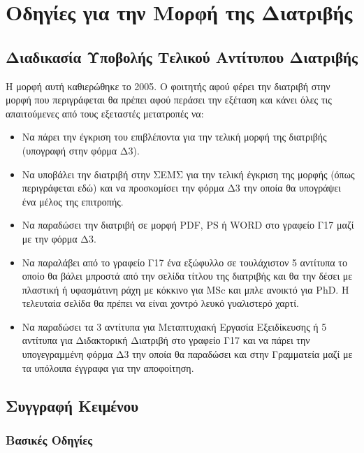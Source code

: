 \chapter{Οδηγίες για την Μορφή της Διατριβής}
\label{ch:Instructions}
\minitoc


\section{Διαδικασία Υποβολής Τελικού Αντίτυπου Διατριβής}
\label{sec:Submission}

{\color{red}
Η μορφή αυτή καθιερώθηκε το 2005. Ο φοιτητής αφού φέρει την
διατριβή στην μορφή που περιγράφεται θα πρέπει αφού περάσει την
εξέταση και κάνει όλες τις απαιτούμενες από τους εξεταστές
μετατροπές να:

\begin{itemize}
\item Να πάρει την έγκριση του επιβλέποντα για την τελική μορφή της διατριβής (υπογραφή στην φόρμα Δ3).
\item Να υποβάλει την διατριβή στην ΣΕΜΣ για την τελική έγκριση της μορφής (όπως περιγράφεται εδώ) και να προσκομίσει την φόρμα Δ3 την οποία θα υπογράψει ένα μέλος της επιτροπής.
\item Να παραδώσει την διατριβή σε μορφή PDF, PS ή WORD στο γραφείο Γ17 μαζί με την φόρμα Δ3.
\item Να παραλάβει από το γραφείο Γ17 ένα εξώφυλλο σε τουλάχιστον 5 αντίτυπα το οποίο θα βάλει μπροστά από την σελίδα τίτλου της διατριβής και θα την δέσει με πλαστική ή υφασμάτινη ράχη με κόκκινο για MSc και μπλε ανοικτό για PhD. H τελευταία σελίδα θα πρέπει να είναι χοντρό λευκό γυαλιστερό χαρτί.
\item Να παραδώσει τα 3 αντίτυπα για Μεταπτυχιακή Εργασία Εξειδίκευσης ή 5 αντίτυπα για Διδακτορική Διατριβή στο γραφείο Γ17 και να πάρει την υπογεγραμμένη φόρμα Δ3 την οποία θα παραδώσει και στην Γραμματεία μαζί με τα υπόλοιπα έγγραφα για την αποφοίτηση.
\end{itemize}}


\section{Συγγραφή Κειμένου}
\label{sec:Text}

\subsection{Βασικές Οδηγίες}
\label{subsec:Basic}


